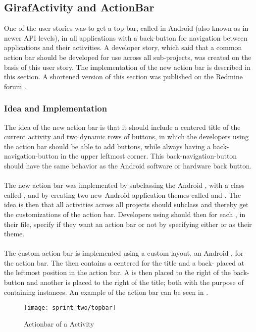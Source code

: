 \subsection{GirafActivity and ActionBar}
\label{sec:giraf_activity_actionbar}

One of the user stories was to get a top-bar, called  in Android (also known as  in newer API levels), in all applications with a back-button for navigation between applications and their activities. A developer story, which said that a common action bar should be developed for use across all sub-projects, was created on the basis of this user story. The implementation of the new \giraf action bar is described in this section. A shortened version of this section was published on the \giraf Redmine forum \parencite{redmine}.

\subsubsection{Idea and Implementation}

The idea of the new action bar is that it should include a centered title of the current activity and two dynamic rows of \giraf buttons, in which the developers using the action bar should be able to add buttons, while always having a back-navigation-button in the upper leftmost corner. This back-navigation-button should have the same behavior as the Android software or hardware back button.
\\\\
The new action bar was implemented by subclassing the Android , with a class called , and by creating two new Android application themes called  and . The idea is then that all activities across all projects should subclass  and thereby get the customizations of the action bar. Developers using  should then for each , in their  file, specify if they want an action bar or not by specifying either  or  as their theme.
\\\\
The custom action bar is implemented using a custom layout, an Android , for the action bar. The  then contains a centered  for the title and a back- placed at the leftmost position in the action bar. A  is then placed to the right of the back-button and another  is placed to the right of the title; both with the purpose of containing  instances. An example of the action bar can be seen in .

\begin{figure}[!htbp]
    \centering
    \texttt{[image: sprint\_two/topbar]}
    \caption{Actionbar of a \giraf Activity}
    \label{fig:topbar}
\end{figure}         
